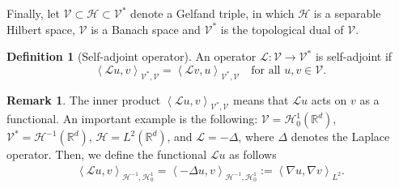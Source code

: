 \documentclass[11pt,a4paper,reqno]{amsart}
\numberwithin{equation}{section}
\theoremstyle{plain}
\newtheorem{lemma}[theorem]{Lemma}
\theoremstyle{definition}
\newtheorem{definition}[theorem]{Definition}
\newtheorem{remark}[theorem]{Remark}
\newcommand{\ip}[1]{\left\langle#1\right\rangle}
\newcommand{\cL}{\mathcal{L}}
\newcommand{\cH}{\mathcal{H}}
\newcommand{\R}{\mathbb{R}}
\newcommand{\cV}{\mathcal{V}}
\begin{document}
Finally, let $\mathcal V \subset \mathcal H \subset \mathcal V^*$ denote a Gelfand triple, in which $\mathcal{H}$ is a separable Hilbert space, $\mathcal{V}$ is a Banach space and $\mathcal{V}^*$ is the topological dual of $\mathcal{V}$.

\begin{definition}[Self-adjoint operator]
An operator $\cL:\mathcal{V} \to \mathcal{V}^*$ is self-adjoint if
\[
    \ip{\cL u,v}_{\cV^*,\cV} = \ip{\cL v,u}_{\cV^*,\cV} \quad \text{for all \ } u,v \in \mathcal{V}.
\]
\end{definition}

\begin{remark}
The inner product $\ip{\cL u,v}_{\cV^*,\cV}$ means that $\cL u$ acts on $v$ as a functional. 
An important example is the following: $\mathcal{V}=\cH_0^1(\R^d)$, $\mathcal{V}^*=\cH^{-1}(\R^d)$, $\mathcal H = L^2(\R^d)$, and $\cL=-\Delta$, where $\Delta$ denotes the Laplace operator. 
Then, we define the functional $\cL u$ as follows 
\begin{align*}
    \ip{\cL u,v}_{\cH^{-1},\cH_0^1}=\ip{-\Delta u,v}_{\cH^{-1},\cH_0^1}:= \ip{\nabla u,\nabla v}_{L^2}.
\end{align*}
\end{remark}

%
%
\end{document}
